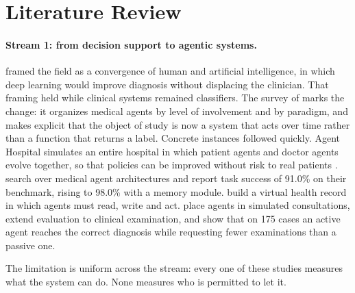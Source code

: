 \section{Literature Review}
\label{sec:litreview}

\paragraph{Stream 1: from decision support to agentic systems.}
\citet{topol2019} framed the field as a convergence of human and artificial intelligence, in which deep learning would improve diagnosis without displacing the clinician. That framing held while clinical systems remained classifiers. The survey of \citet{wang2025baymax} marks the change: it organizes medical agents by level of involvement and by paradigm, and makes explicit that the object of study is now a system that acts over time rather than a function that returns a label. Concrete instances followed quickly. Agent Hospital simulates an entire hospital in which patient agents and doctor agents evolve together, so that policies can be improved without risk to real patients \citep{li2024agenthospital}. \citet{zhuang2025learning} search over medical agent architectures and report task success of 91.0\% on their benchmark, rising to 98.0\% with a memory module. \citet{jiang2025medagentbench} build a virtual health record in which agents must read, write and act. \citet{schmidgall2024agentclinic} place agents in simulated consultations, \citet{gao2026medexagent} extend evaluation to clinical examination, and \citet{ma2026activemedagent} show that on 175 cases an active agent reaches the correct diagnosis while requesting fewer examinations than a passive one.

The limitation is uniform across the stream: every one of these studies measures what the system can do. None measures who is permitted to let it.

